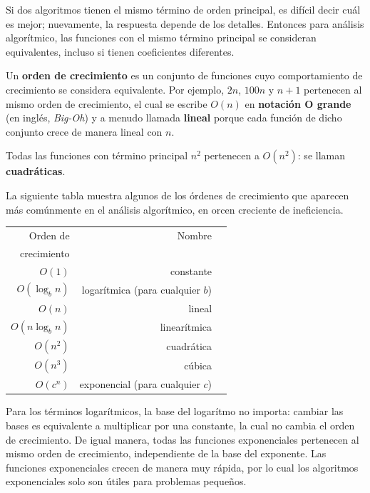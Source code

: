 \documentclass[10pt]{book}
\begin{document}
Si dos algoritmos tienen el mismo término de orden principal, es difícil decir
cuál es mejor; nuevamente, la respuesta depende de los detalles.  Entonces para
análisis algorítmico, las funciones con el mismo término principal
se consideran equivalentes, incluso si tienen coeficientes diferentes.

Un {\bf orden de crecimiento} es un conjunto de funciones cuyo comportamiento
de crecimiento se considera equivalente.  Por ejemplo, $2n$, $100n$ y $n+1$
pertenecen al mismo orden de crecimiento, el cual se escribe $O(n)$ en
{\bf notación O grande} (en inglés, {\em Big-Oh}) y a menudo llamada {\bf lineal} porque cada función
de dicho conjunto crece de manera lineal con $n$.
 

Todas las funciones con término principal $n^2$ pertenecen a $O(n^2)$: se
llaman {\bf cuadráticas}.

La siguiente tabla muestra algunos de los órdenes de crecimiento que
aparecen más comúnmente en el análisis algorítmico,
en orcen creciente de ineficiencia.

\begin{tabular}{|r|r|r|}
\hline
Orden de     &   Nombre      \\
crecimiento  &               \\
\hline
$O(1)$             & constante \\
$O(\log_b n)$      & logarítmica (para cualquier $b$) \\
$O(n)$             & lineal \\
$O(n \log_b n)$    & linearítmica \\
$O(n^2)$           & cuadrática    \\
$O(n^3)$           & cúbica    \\
$O(c^n)$           & exponencial (para cualquier $c$)    \\
\hline
\end{tabular}

Para los términos logarítmicos, la base del logarítmo no importa:
cambiar las bases es equivalente a multiplicar por una constante, la cual
no cambia el orden de crecimiento.  De igual manera, todas las
funciones exponenciales pertenecen al mismo orden de crecimiento, independiente de
la base del exponente.
Las funciones exponenciales crecen de manera muy rápida, por lo cual los algoritmos exponenciales
solo son útiles para problemas pequeños.
\end{document}
